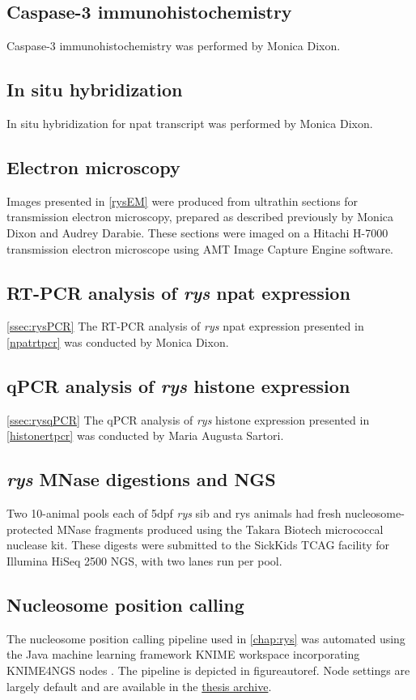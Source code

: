 \subsection{Caspase-3 immunohistochemistry}
\label{ssec:ryscaspase}
Caspase-3 immunohistochemistry was performed by Monica Dixon. 

\subsection{In situ hybridization}
\label{ssec:rysISH}
In situ hybridization for npat transcript was performed by Monica Dixon.

\subsection{Electron microscopy}
\label{ssec:rysEM}
Images presented in \autoref{rysEM} were produced from ultrathin sections for transmission electron microscopy, prepared as described previously \cite{Lindsey2012} by Monica Dixon and Audrey Darabie. These sections were imaged on a Hitachi H-7000 transmission electron microscope using AMT Image Capture Engine software. 

\subsection{RT-PCR analysis of \textit{rys} npat expression}
\autoref{ssec:rysPCR}
The RT-PCR analysis of \textit{rys} npat expression presented in \autoref{npatrtpcr} was conducted by Monica Dixon.

\subsection{qPCR analysis of \textit{rys} histone expression}
\autoref{ssec:rysqPCR}
The qPCR analysis of \textit{rys} histone expression presented in \autoref{histonertpcr} was conducted by Maria Augusta Sartori.

\subsection{\textit{rys} MNase digestions and NGS}
Two 10-animal pools each of 5dpf \textit{rys} sib and rys animals had fresh nucleosome-protected MNase fragments produced using the Takara Biotech micrococcal nuclease kit. These digests were submitted to the SickKids TCAG  facility for Illumina HiSeq 2500 NGS, with two lanes run per pool.

\subsection{Nucleosome position calling}
\label{ssec:rysposcall}
The nucleosome position calling pipeline used in \autoref{chap:rys} was automated using the Java machine learning framework KNIME \cite{Dietz2016} workspace incorporating KNIME4NGS nodes \cite{Hastreiter2017}. The pipeline is depicted in figureautoref. Node settings are largely default and are available in the  \hyperref[sec:archive]{thesis archive}.

